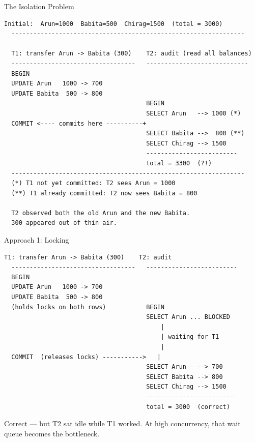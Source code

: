 \documentclass[aspectratio=169,10pt]{beamer}
\begin{document}
\begin{frame}[fragile]{The Isolation Problem}

\begin{lstlisting}[style=ascii]
  Initial:  Arun=1000  Babita=500  Chirag=1500  (total = 3000)
  ----------------------------------------------------------------

  T1: transfer Arun -> Babita (300)    T2: audit (read all balances)
  ----------------------------------   ----------------------------
  BEGIN
  UPDATE Arun   1000 -> 700
  UPDATE Babita  500 -> 800
                                       BEGIN
                                       SELECT Arun   --> 1000 (*)
  COMMIT <---- commits here ----------+
                                       SELECT Babita -->  800 (**)
                                       SELECT Chirag --> 1500
                                       -------------------------
                                       total = 3300  (?!)
  ----------------------------------------------------------------
  (*) T1 not yet committed: T2 sees Arun = 1000
  (**) T1 already committed: T2 now sees Babita = 800

  T2 observed both the old Arun and the new Babita.
  300 appeared out of thin air.
\end{lstlisting}

\end{frame}

\begin{frame}[fragile]{Approach 1: Locking}

\begin{lstlisting}[style=ascii]
  T1: transfer Arun -> Babita (300)    T2: audit
  ----------------------------------   -------------------------
  BEGIN
  UPDATE Arun   1000 -> 700
  UPDATE Babita  500 -> 800
  (holds locks on both rows)           BEGIN
                                       SELECT Arun ... BLOCKED
                                           |
                                           | waiting for T1
                                           |
  COMMIT  (releases locks) ----------->   |
                                       SELECT Arun   --> 700
                                       SELECT Babita --> 800
                                       SELECT Chirag --> 1500
                                       -------------------------
                                       total = 3000  (correct)
\end{lstlisting}

{\small Correct --- but T2 sat idle while T1 worked.
At high concurrency, that wait queue becomes the bottleneck.}

\end{frame}
\end{document}

